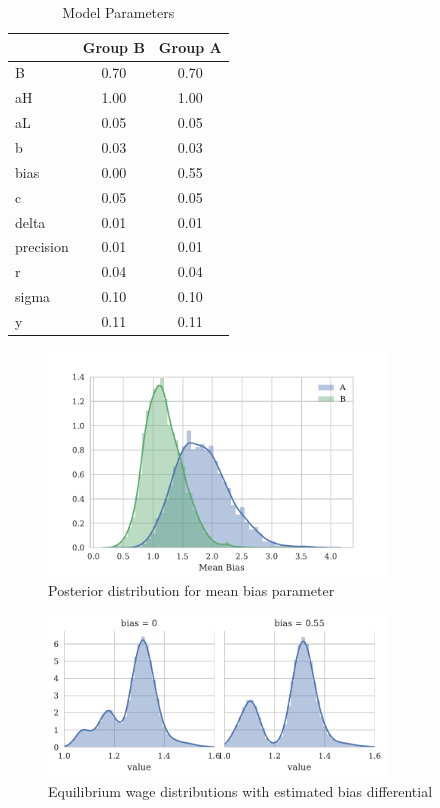 \documentclass[a4paper,12pt]{article}
\begin{document}
\begin{appendices}
\begin{table}
  \caption{Model Parameters}
  \label{table:model-params}
  \begin{center}
    \begin{tabular}{lcc}
      \hline
      & Group B & Group A  \\
      \hline
      \hline
      B         &    0.70 &    0.70  \\
      aH        &    1.00 &    1.00  \\
      aL        &    0.05 &    0.05  \\
      b         &    0.03 &    0.03  \\
      bias      &    0.00 &    0.55  \\
      c         &    0.05 &    0.05  \\
      delta     &    0.01 &    0.01  \\
      precision &    0.01 &    0.01  \\
      r         &    0.04 &    0.04  \\
      sigma     &    0.10 &    0.10  \\
      y         &    0.11 &    0.11  \\
      \hline
    \end{tabular}
  \end{center}
\end{table}

\begin{figure}[h]
    \centering
    \includegraphics[width=0.8\textwidth]{../experiments/mean-bias}
    \caption{Posterior distribution for mean bias parameter}
    \label{fig:posterior-mean-bias}
\end{figure}

\begin{figure}[h]
    \centering
    \includegraphics[width=0.8\textwidth]{../equilibrium/wage-distributions}
    \caption{Equilibrium wage distributions with estimated bias differential}
    \label{fig:wage-distributions}
\end{figure}


\end{appendices}
\end{document}
